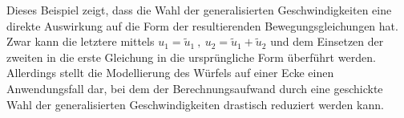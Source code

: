 Dieses Beispiel zeigt, dass die Wahl der generalisierten Geschwindigkeiten eine direkte Auswirkung auf die Form der resultierenden Bewegungsgleichungen hat. Zwar kann die letztere mittels $u_1 = \tilde{u}_1 \ ,\ u_2 = \tilde{u}_1 + \tilde{u}_2$ und dem Einsetzen der zweiten in die erste Gleichung in die ursprüngliche Form überführt werden. Allerdings stellt die Modellierung des Würfels auf einer Ecke einen Anwendungsfall dar, bei dem der Berechnungsaufwand durch eine geschickte Wahl der generalisierten Geschwindigkeiten drastisch reduziert werden kann.